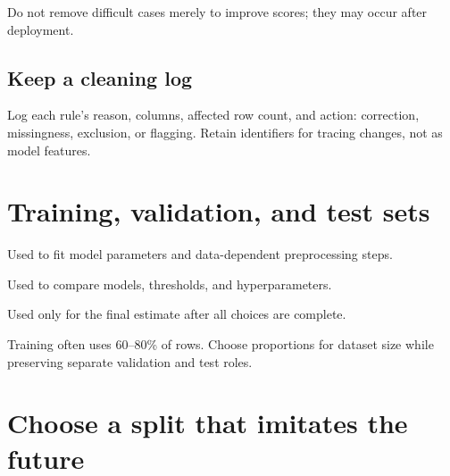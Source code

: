 \begin{pitfall}
Do not remove difficult cases merely to improve scores; they may occur after deployment.
\end{pitfall}

\subsection{Keep a cleaning log}

Log each rule's reason, columns, affected row count, and action: correction, missingness, exclusion, or flagging. Retain identifiers for tracing changes, not as model features.

\section{Training, validation, and test sets}
\label{sec:data-splits}

\begin{mlfigure}
\end{mlfigure}

\begin{description}[leftmargin=1.15in,style=nextline]
  \item[Training set] Used to fit model parameters and data-dependent preprocessing steps.
  \item[Validation set] Used to compare models, thresholds, and hyperparameters.
  \item[Test set] Used only for the final estimate after all choices are complete.
\end{description}

Training often uses 60--80\% of rows. Choose proportions for dataset size while preserving separate validation and test roles.

\section{Choose a split that imitates the future}

